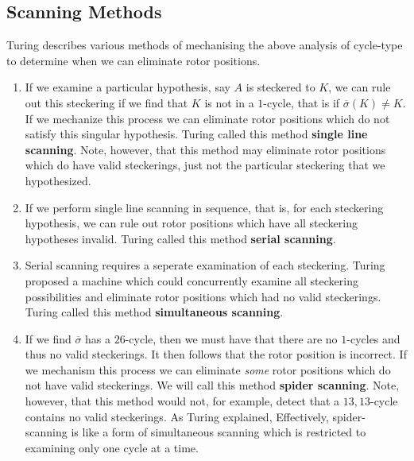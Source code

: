 \subsection{Scanning Methods}
Turing describes various methods of mechanising the above analysis of
cycle-type to determine when we can eliminate rotor positions.
\begin{enumerate}
  \item If we examine a particular hypothesis, say $A$ is steckered
    to $K$, we can rule out this steckering if we find that $K$ is
    not in a $1$-cycle, that is if $\overline\sigma(K) \ne K$. If we
    mechanize this process we can eliminate rotor positions which do
    not satisfy this singular hypothesis. Turing called this method
    \textbf{single line scanning}. Note, however, that this method
    may eliminate rotor
    positions which do have valid steckerings, just not the
    particular steckering that we hypothesized.
  \item If we perform single line scanning in sequence, that is, for
    each steckering hypothesis, we can rule out rotor positions which
    have all steckering hypotheses invalid. Turing called this method
    \textbf{serial scanning}.
  \item Serial scanning requires a seperate examination of each
    steckering. Turing proposed a machine which could concurrently
    examine all steckering possibilities and eliminate rotor positions
    which had no valid steckerings. Turing called this method
    \textbf{simultaneous scanning}.
  \item If we find $\overline\sigma$ has a $26$-cycle, then we must
    have that there are no $1$-cycles and thus no valid steckerings.
    It then follows that the rotor position is incorrect.
    If we mechanism this process we can eliminate \emph{some} rotor
    positions which do not have valid steckerings. We will call this
    method \textbf{spider scanning}. Note, however, that this method
    would not, for example, detect that a $13,13$-cycle contains no
    valid steckerings. As Turing explained,
     Effectively, spider-scanning is like a form of
    simultaneous scanning which is restricted
    to examining only one cycle at a time.
\end{enumerate}
